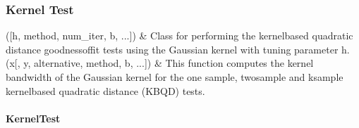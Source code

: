 \documentclass[letterpaper,10pt,english,openany,oneside]{sphinxmanual}
\begin{document}
{{{{\subsubsection{Kernel Test}
\label{\detokenize{api_reference/index:kernel-test}}

\begin{savenotes}\sphinxattablestart
\sphinxthistablewithglobalstyle
\sphinxthistablewithnovlinesstyle
\centering
\begin{tabulary}{\linewidth}[t]{}
\sphinxtoprule
\sphinxtableatstartofbodyhook
\sphinxAtStartPar
{\hyperref[\detokenize{api_reference/generated/QuadratiK.kernel_test.KernelTest:QuadratiK.kernel_test.KernelTest}]{}}({[}h, method, num\_iter, b, ...{]})
&
\sphinxAtStartPar
Class for performing the kernel\sphinxhyphen{}based quadratic distance goodness\sphinxhyphen{}of\sphinxhyphen{}fit tests using the Gaussian kernel with tuning parameter h.
\\
\sphinxhline
\sphinxAtStartPar
{\hyperref[\detokenize{api_reference/generated/QuadratiK.kernel_test.select_h:QuadratiK.kernel_test.select_h}]{}}(x{[}, y, alternative, method, b, ...{]})
&
\sphinxAtStartPar
This function computes the kernel bandwidth of the Gaussian kernel for the one sample, two\sphinxhyphen{}sample and k\sphinxhyphen{}sample kernel\sphinxhyphen{}based quadratic distance (KBQD) tests.
\\
\sphinxbottomrule
\end{tabulary}
\sphinxtableafterendhook\par
\sphinxattableend\end{savenotes}

\sphinxstepscope


\paragraph{KernelTest}
\label{\detokenize{api_reference/generated/QuadratiK.kernel_test.KernelTest:kerneltest}}\label{\detokenize{api_reference/generated/QuadratiK.kernel_test.KernelTest::doc}}

}}}}
\end{document}
